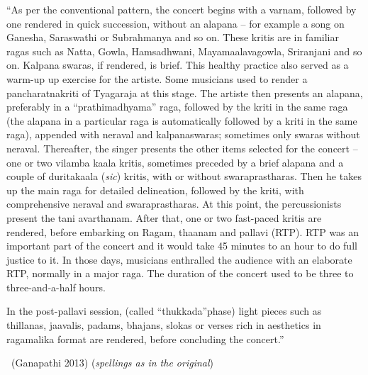 \begin{myquote}
“As per the conventional pattern, the concert begins with a varnam, followed by one rendered in quick succession, without an alapana – for example a song on Ganesha, Saraswathi or Subrahmanya and so on. These kritis are in familiar ragas such as Natta, Gowla, Hamsadhwani, Mayamaalavagowla, Sriranjani and so on. Kalpana swaras, if rendered, is brief. This healthy practice also served as a warm-up up exercise for the artiste. Some musicians used to render a pancharatnakriti of Tyagaraja at this stage. The artiste then presents an alapana, preferably in a “prathimadhyama” raga, followed by the kriti in the same raga (the alapana in a particular raga is automatically followed by a kriti in the same raga), appended with neraval and kalpanaswaras; sometimes only swaras without neraval. Thereafter, the singer presents the other items selected for the concert – one or two vilamba kaala kritis, sometimes preceded by a brief alapana and a couple of duritakaala (\textit{sic}) kritis, with or without swaraprastharas. Then he takes up the main raga for detailed delineation, followed by the kriti, with comprehensive neraval and swaraprastharas. At this point, the percussionists present the tani avarthanam. After that, one or two fast-paced kritis are rendered, before embarking on Ragam, thaanam and pallavi (RTP). RTP was an important part of the concert and it would take 45 minutes to an hour to do full justice to it. In those days, musicians enthralled the audience with an elaborate RTP, normally in a major raga. The duration of the concert used to be three to three-and-a-half hours.
\end{myquote}

\begin{myquote}
In the post-pallavi session, (called “thukkada”phase) light pieces such as thillanas, jaavalis, padams, bhajans, slokas or verses rich in aesthetics in ragamalika format are rendered, before concluding the concert.” 

~\hfill (Ganapathi 2013) (\textit{spellings as in the original})
\end{myquote}

